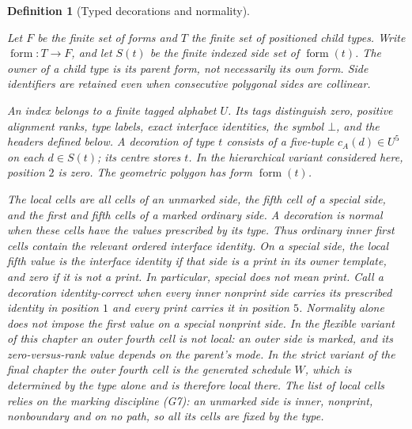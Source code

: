 \documentclass[11pt,a4paper]{article}
\newtheorem{definition}{Definition}[section]
\theoremstyle{remark}
\newcommand{\lean}[1]{}
\newcommand{\uses}[1]{}
\begin{document}
\begin{definition}[Typed decorations and normality]
\label{def:control/typed-decoration}
\lean{Tilings.Planned.typedDecoration}
\uses{def:certificate,def:substitution}
Let $F$ be the finite set of forms and $T$ the finite set of positioned child
types. Write $\operatorname{form}:T\to F$, and let $S(t)$ be the finite
indexed side set of $\operatorname{form}(t)$. The owner of a child type is
its parent form, not necessarily its own form. Side identifiers are retained
even when consecutive polygonal sides are collinear.

An index belongs to a finite tagged alphabet $U$. Its tags distinguish zero,
positive alignment ranks, type labels, exact interface identities, the symbol
$\bot$, and the headers defined below. A decoration of type $t$ consists
of a five-tuple $c_A(d)\in U^5$ on each $d\in S(t)$; its centre stores $t$.
In the hierarchical variant considered here, position $2$ is zero. The
geometric polygon has form $\operatorname{form}(t)$.

The local cells are all cells of an unmarked side, the fifth cell of a special
side, and the first and fifth cells of a marked ordinary side. A decoration
is \emph{normal} when these cells have the values prescribed by its type.
Thus ordinary inner first cells contain the relevant ordered interface identity.
On a special side, the local fifth value is the interface identity if that side
is a print in its owner template, and zero if it is not a print. In particular,
special does not mean print. Call a decoration \emph{identity-correct} when
every inner nonprint side carries its prescribed identity in position $1$
and every print carries it in position $5$. Normality alone does not impose
the first value on a special nonprint side. In the flexible variant of
this chapter an outer fourth cell is not local: an outer side is marked,
and its zero-versus-rank value depends on the parent's mode. In the strict
variant of the final chapter the outer fourth cell is the generated
schedule $W$, which is determined by the type alone and is therefore local
there. The list of local cells relies on the marking discipline (G7): an
unmarked side is inner, nonprint, nonboundary and on no path, so all its
cells are fixed by the type.
\end{definition}
\end{document}
